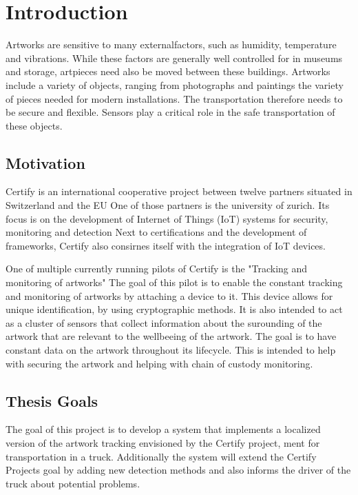 \chapter{Introduction}
\label{introduction}


Artworks are sensitive to many externalfactors, such as humidity, temperature and vibrations.
While these factors are generally well controlled for in museums and storage, artpieces need also be moved between these buildings.
Artworks include a variety of objects, ranging from photographs and paintings the variety of pieces needed for modern installations.
The transportation therefore needs to be secure and flexible.
Sensors play a critical role in the safe transportation of these objects.


\section{Motivation}

Certify is an international cooperative project between twelve partners situated in Switzerland and the EU %
One of those partners is the university of zurich.
Its focus is on the development of Internet of Things (IoT) systems for security, monitoring and detection %
Next to certifications and the development of frameworks, Certify also consirnes itself with the integration of IoT devices.


One of multiple currently running pilots of Certify is the "Tracking and monitoring of artworks" %
The goal of this pilot is to enable the constant tracking and monitoring of artworks by attaching a device to it.
This device allows for unique identification, by using cryptographic methods.
It is also intended to act as a cluster of sensors that collect information about the surounding of the artwork that are relevant to the wellbeeing of the artwork.
The goal is to have constant data on the artwork throughout its lifecycle.
This is intended to help with securing the artwork and helping with chain of custody monitoring.



\section{Thesis Goals}

The goal of this project is to develop a system that implements a localized version of the artwork tracking envisioned by the Certify project, ment for transportation in a truck.
Additionally the system will extend the Certify Projects goal by adding new detection methods and also informs the driver of the truck about potential problems.

